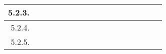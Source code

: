 \documentclass[12pt]{article}
\begin{document}
\begin{table}[H]
{\begin{tabular}{|rllllllllllllllll|}
			\multicolumn{1}{|r|}{5.2.3.}                                       & \multicolumn{1}{l|}{}                          & \multicolumn{1}{l|}{}                          & \multicolumn{1}{l|}{}                          & \multicolumn{1}{l|}{}                          & \multicolumn{1}{c|}{\cellcolor[HTML]{A4C2F4}}  & \multicolumn{1}{c|}{\cellcolor[HTML]{A4C2F4}}  & \multicolumn{1}{c|}{\cellcolor[HTML]{A4C2F4}}  & \multicolumn{1}{l|}{}                          & \multicolumn{1}{l|}{}                          & \multicolumn{1}{l|}{}                           & \multicolumn{1}{l|}{}                           & \multicolumn{1}{l|}{}                           & \multicolumn{1}{l|}{}                           & \multicolumn{1}{l|}{}                           & \multicolumn{1}{l|}{}                           &                                                 \\ \hline
			\multicolumn{1}{|r|}{5.2.4.}                                       & \multicolumn{1}{l|}{}                          & \multicolumn{1}{l|}{}                          & \multicolumn{1}{l|}{}                          & \multicolumn{1}{l|}{}                          & \multicolumn{1}{c|}{\cellcolor[HTML]{A4C2F4}}  & \multicolumn{1}{c|}{\cellcolor[HTML]{A4C2F4}}  & \multicolumn{1}{c|}{\cellcolor[HTML]{A4C2F4}}  & \multicolumn{1}{l|}{}                          & \multicolumn{1}{l|}{}                          & \multicolumn{1}{l|}{}                           & \multicolumn{1}{l|}{}                           & \multicolumn{1}{l|}{}                           & \multicolumn{1}{l|}{}                           & \multicolumn{1}{l|}{}                           & \multicolumn{1}{l|}{}                           &                                                 \\ \hline
			\multicolumn{1}{|r|}{5.2.5.}                                       & \multicolumn{1}{l|}{}                          & \multicolumn{1}{l|}{}                          & \multicolumn{1}{l|}{}                          & \multicolumn{1}{l|}{}                          & \multicolumn{1}{l|}{}                          & \multicolumn{1}{l|}{}                          & \multicolumn{1}{c|}{\cellcolor[HTML]{A4C2F4}}  & \multicolumn{1}{l|}{}                          & \multicolumn{1}{l|}{}                          & \multicolumn{1}{l|}{}                           & \multicolumn{1}{l|}{}                           & \multicolumn{1}{l|}{}                           & \multicolumn{1}{l|}{}                           & \multicolumn{1}{l|}{}                           & \multicolumn{1}{l|}{}                           &                                                 \\ \hline

\end{tabular}}
\end{table}
\end{document}
